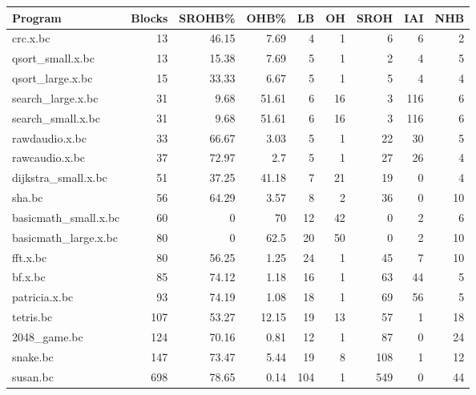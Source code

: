 \begin{tabular}{lrrrr}
\end{tabular}\begin{tabular}{lrrrrrrrr}
\hline
 Program              &   Blocks &   SROHB\% &   OHB\% &   LB &   OH &   SROH &   IAI &   NHB \\
\hline
 crc.x.bc             &       13 &    46.15 &   7.69 &    4 &    1 &      6 &     6 &     2 \\
 qsort\_small.x.bc     &       13 &    15.38 &   7.69 &    5 &    1 &      2 &     4 &     5 \\
 qsort\_large.x.bc     &       15 &    33.33 &   6.67 &    5 &    1 &      5 &     4 &     4 \\
 search\_large.x.bc    &       31 &     9.68 &  51.61 &    6 &   16 &      3 &   116 &     6 \\
 search\_small.x.bc    &       31 &     9.68 &  51.61 &    6 &   16 &      3 &   116 &     6 \\
 rawdaudio.x.bc       &       33 &    66.67 &   3.03 &    5 &    1 &     22 &    30 &     5 \\
 rawcaudio.x.bc       &       37 &    72.97 &   2.7  &    5 &    1 &     27 &    26 &     4 \\
 dijkstra\_small.x.bc  &       51 &    37.25 &  41.18 &    7 &   21 &     19 &     0 &     4 \\
 sha.bc               &       56 &    64.29 &   3.57 &    8 &    2 &     36 &     0 &    10 \\
 basicmath\_small.x.bc &       60 &     0    &  70    &   12 &   42 &      0 &     2 &     6 \\
 basicmath\_large.x.bc &       80 &     0    &  62.5  &   20 &   50 &      0 &     2 &    10 \\
 fft.x.bc             &       80 &    56.25 &   1.25 &   24 &    1 &     45 &     7 &    10 \\
 bf.x.bc              &       85 &    74.12 &   1.18 &   16 &    1 &     63 &    44 &     5 \\
 patricia.x.bc        &       93 &    74.19 &   1.08 &   18 &    1 &     69 &    56 &     5 \\
 tetris.bc            &      107 &    53.27 &  12.15 &   19 &   13 &     57 &     1 &    18 \\
 2048\_game.bc         &      124 &    70.16 &   0.81 &   12 &    1 &     87 &     0 &    24 \\
 snake.bc             &      147 &    73.47 &   5.44 &   19 &    8 &    108 &     1 &    12 \\
 susan.bc             &      698 &    78.65 &   0.14 &  104 &    1 &    549 &     0 &    44 \\

\end{tabular}

